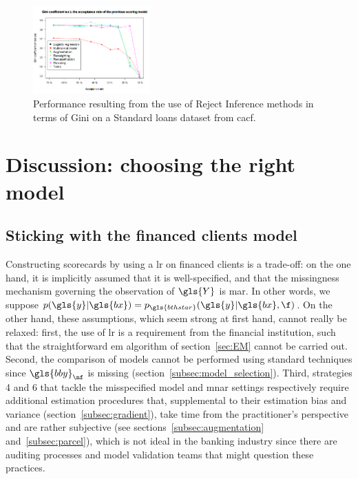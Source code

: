 \begin{figure}[H]
\centering
\includegraphics[width=0.4\textwidth]{figures/appendix/rejectinferenceM3.png}
\caption{Performance resulting from the use of Reject Inference methods in terms of Gini on a Standard loans dataset from \gls{cacf}.}
\label{fig:M3_reject}
\end{figure}


\section{Discussion: choosing the right model} \label{sec:conclusion_reject}

\subsection{Sticking with the financed clients model}

Constructing scorecards by using a \gls{lr} on financed clients is a trade-off: on the one hand, it is implicitly assumed that it is well-specified, and that the missingness mechanism governing the observation of $\gls{Y}$ is \gls{mar}. In other words, we suppose $p(\gls{y} | \gls{bx}) = p_{\gls{bthstar}}(\gls{y} | \gls{bx}, \f)$. On the other hand, these assumptions, which seem strong at first hand, cannot really be relaxed: first, the use of \gls{lr} is a requirement from the financial institution, such that the straightforward \gls{em} algorithm of section~\ref{sec:EM} cannot be carried out. Second, the comparison of models cannot be performed using standard techniques since $\gls{bby}_{\nf}$ is missing (section~\ref{subsec:model_selection}). Third, strategies 4 and 6 that tackle the misspecified model and \gls{mnar} settings respectively require additional estimation procedures that, supplemental to their estimation bias and variance (section~\ref{subsec:gradient}), take time from the practitioner's perspective and are rather subjective (see sections~\ref{subsec:augmentation} and~\ref{subsec:parcel}), which is not ideal in the banking industry since there are auditing processes and model validation teams that might question these practices.

